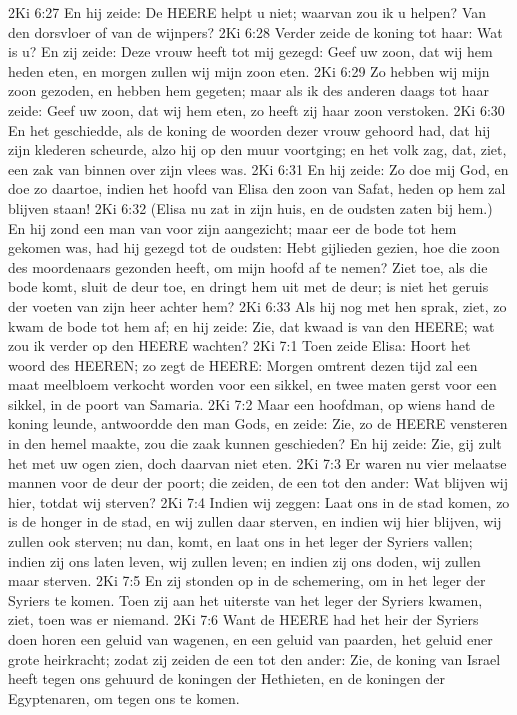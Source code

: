 2Ki 6:27  En hij zeide: De HEERE helpt u niet; waarvan zou ik u helpen? Van den dorsvloer of van de wijnpers?
2Ki 6:28  Verder zeide de koning tot haar: Wat is u? En zij zeide: Deze vrouw heeft tot mij gezegd: Geef uw zoon, dat wij hem heden eten, en morgen zullen wij mijn zoon eten.
2Ki 6:29  Zo hebben wij mijn zoon gezoden, en hebben hem gegeten; maar als ik des anderen daags tot haar zeide: Geef uw zoon, dat wij hem eten, zo heeft zij haar zoon verstoken.
2Ki 6:30  En het geschiedde, als de koning de woorden dezer vrouw gehoord had, dat hij zijn klederen scheurde, alzo hij op den muur voortging; en het volk zag, dat, ziet, een zak van binnen over zijn vlees was.
2Ki 6:31  En hij zeide: Zo doe mij God, en doe zo daartoe, indien het hoofd van Elisa den zoon van Safat, heden op hem zal blijven staan!
2Ki 6:32  (Elisa nu zat in zijn huis, en de oudsten zaten bij hem.) En hij zond een man van voor zijn aangezicht; maar eer de bode tot hem gekomen was, had hij gezegd tot de oudsten: Hebt gijlieden gezien, hoe die zoon des moordenaars gezonden heeft, om mijn hoofd af te nemen? Ziet toe, als die bode komt, sluit de deur toe, en dringt hem uit met de deur; is niet het geruis der voeten van zijn heer achter hem?
2Ki 6:33  Als hij nog met hen sprak, ziet, zo kwam de bode tot hem af; en hij zeide: Zie, dat kwaad is van den HEERE; wat zou ik verder op den HEERE wachten?
2Ki 7:1  Toen zeide Elisa: Hoort het woord des HEEREN; zo zegt de HEERE: Morgen omtrent dezen tijd zal een maat meelbloem verkocht worden voor een sikkel, en twee maten gerst voor een sikkel, in de poort van Samaria.
2Ki 7:2  Maar een hoofdman, op wiens hand de koning leunde, antwoordde den man Gods, en zeide: Zie, zo de HEERE vensteren in den hemel maakte, zou die zaak kunnen geschieden? En hij zeide: Zie, gij zult het met uw ogen zien, doch daarvan niet eten.
2Ki 7:3  Er waren nu vier melaatse mannen voor de deur der poort; die zeiden, de een tot den ander: Wat blijven wij hier, totdat wij sterven?
2Ki 7:4  Indien wij zeggen: Laat ons in de stad komen, zo is de honger in de stad, en wij zullen daar sterven, en indien wij hier blijven, wij zullen ook sterven; nu dan, komt, en laat ons in het leger der Syriers vallen; indien zij ons laten leven, wij zullen leven; en indien zij ons doden, wij zullen maar sterven.
2Ki 7:5  En zij stonden op in de schemering, om in het leger der Syriers te komen. Toen zij aan het uiterste van het leger der Syriers kwamen, ziet, toen was er niemand.
2Ki 7:6  Want de HEERE had het heir der Syriers doen horen een geluid van wagenen, en een geluid van paarden, het geluid ener grote heirkracht; zodat zij zeiden de een tot den ander: Zie, de koning van Israel heeft tegen ons gehuurd de koningen der Hethieten, en de koningen der Egyptenaren, om tegen ons te komen.
